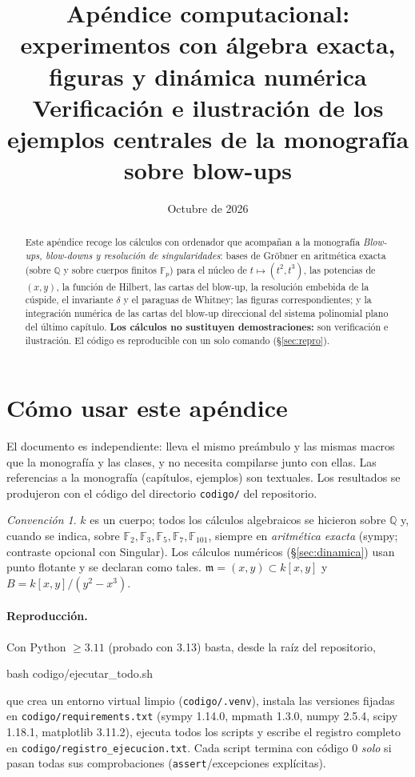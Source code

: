 \documentclass[11pt,a4paper]{article}
\title{\textbf{Apéndice computacional: experimentos con álgebra exacta,\\ figuras y dinámica numérica}\\[4pt]
\large Verificación e ilustración de los ejemplos centrales de la monografía sobre blow-ups}
\author{}
\date{Octubre de 2026}
\newcommand{\QQ}{\mathbb{Q}}
\newcommand{\FF}{\mathbb{F}}
\theoremstyle{plain}
\theoremstyle{definition}
\theoremstyle{remark}
\newtheorem*{convencion}{Convención}
\begin{document}
\maketitle

\begin{abstract}\noindent
Este apéndice recoge los cálculos con ordenador que acompañan a la monografía \emph{Blow-ups, blow-downs y resolución de singularidades}: bases de Gröbner en aritmética exacta (sobre $\QQ$ y sobre cuerpos finitos $\FF_p$) para el núcleo de $t\mapsto(t^2,t^3)$, las potencias de $(x,y)$, la función de Hilbert, las cartas del blow-up, la resolución embebida de la cúspide, el invariante $\delta$ y el paraguas de Whitney; las figuras correspondientes; y la integración numérica de las cartas del blow-up direccional del sistema polinomial plano del último capítulo. \textbf{Los cálculos no sustituyen demostraciones:} son verificación e ilustración. El código es reproducible con un solo comando (\S\ref{sec:repro}).
\end{abstract}

\tableofcontents

\section{Cómo usar este apéndice}\label{sec:repro}

El documento es independiente: lleva el mismo preámbulo y las mismas macros que la monografía y las clases, y no necesita compilarse junto con ellas. Las referencias a la monografía (capítulos, ejemplos) son textuales. Los resultados se produjeron con el código del directorio \texttt{codigo/} del repositorio.

\begin{convencion}
$k$ es un cuerpo; todos los cálculos algebraicos se hicieron sobre $\QQ$ y, cuando se indica, sobre $\FF_2,\FF_3,\FF_5,\FF_7,\FF_{101}$, siempre en \emph{aritmética exacta} (sympy; contraste opcional con Singular). Los cálculos numéricos (\S\ref{sec:dinamica}) usan punto flotante y se declaran como tales. $\mathfrak m=(x,y)\subset k[x,y]$ y $B=k[x,y]/(y^2-x^3)$.
\end{convencion}

\paragraph{Reproducción.} Con Python $\ge3.11$ (probado con 3.13) basta, desde la raíz del repositorio,
\begin{codigo}
bash codigo/ejecutar_todo.sh
\end{codigo}
que crea un entorno virtual limpio (\texttt{codigo/.venv}), instala las versiones fijadas en \texttt{codigo/requirements.txt} (sympy 1.14.0, mpmath 1.3.0, numpy 2.5.4, scipy 1.18.1, matplotlib 3.11.2), ejecuta todos los scripts y escribe el registro completo en \texttt{codigo/\allowbreak registro\_ejecucion.txt}. Cada script termina con código $0$ \emph{solo} si pasan todas sus comprobaciones (\texttt{assert}/excepciones explícitas).
\end{document}
